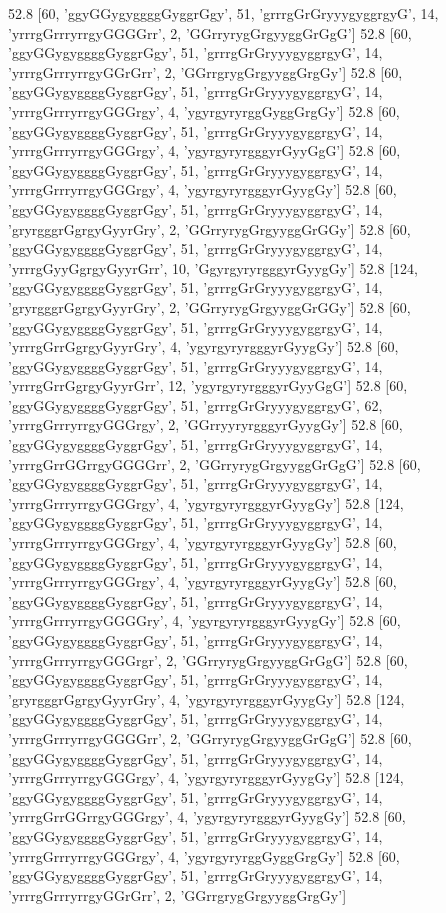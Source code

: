52.8 [60, 'ggyGGygyggggGyggrGgy', 51, 'grrrgGrGryyygyggrgyG', 14, 'yrrrgGrrryrrgyGGGGrr', 2, 'GGrryrygGrgyyggGrGgG']
52.8 [60, 'ggyGGygyggggGyggrGgy', 51, 'grrrgGrGryyygyggrgyG', 14, 'yrrrgGrrryrrgyGGrGrr', 2, 'GGrrgrygGrgyyggGrgGy']
52.8 [60, 'ggyGGygyggggGyggrGgy', 51, 'grrrgGrGryyygyggrgyG', 14, 'yrrrgGrrryrrgyGGGrgy', 4, 'ygyrgyryrggGyggGrgGy']
52.8 [60, 'ggyGGygyggggGyggrGgy', 51, 'grrrgGrGryyygyggrgyG', 14, 'yrrrgGrrryrrgyGGGrgy', 4, 'ygyrgyryrgggyrGyyGgG']
52.8 [60, 'ggyGGygyggggGyggrGgy', 51, 'grrrgGrGryyygyggrgyG', 14, 'yrrrgGrrryrrgyGGGrgy', 4, 'ygyrgyryrgggyrGyygGy']
52.8 [60, 'ggyGGygyggggGyggrGgy', 51, 'grrrgGrGryyygyggrgyG', 14, 'gryrgggrGgrgyGyyrGry', 2, 'GGrryrygGrgyyggGrGGy']
52.8 [60, 'ggyGGygyggggGyggrGgy', 51, 'grrrgGrGryyygyggrgyG', 14, 'yrrrgGyyGgrgyGyyrGrr', 10, 'GgyrgyryrgggyrGyygGy']
52.8 [124, 'ggyGGygyggggGyggrGgy', 51, 'grrrgGrGryyygyggrgyG', 14, 'gryrgggrGgrgyGyyrGry', 2, 'GGrryrygGrgyyggGrGGy']
52.8 [60, 'ggyGGygyggggGyggrGgy', 51, 'grrrgGrGryyygyggrgyG', 14, 'yrrrgGrrGgrgyGyyrGry', 4, 'ygyrgyryrgggyrGyygGy']
52.8 [60, 'ggyGGygyggggGyggrGgy', 51, 'grrrgGrGryyygyggrgyG', 14, 'yrrrgGrrGgrgyGyyrGrr', 12, 'ygyrgyryrgggyrGyyGgG']
52.8 [60, 'ggyGGygyggggGyggrGgy', 51, 'grrrgGrGryyygyggrgyG', 62, 'yrrrgGrrryrrgyGGGrgy', 2, 'GGrryyryrgggyrGyygGy']
52.8 [60, 'ggyGGygyggggGyggrGgy', 51, 'grrrgGrGryyygyggrgyG', 14, 'yrrrgGrrGGrrgyGGGGrr', 2, 'GGrryrygGrgyyggGrGgG']
52.8 [60, 'ggyGGygyggggGyggrGgy', 51, 'grrrgGrGryyygyggrgyG', 14, 'yrrrgGrrryrrgyGGGrgy', 4, 'ygyrgyryrgggyrGyygGy']
52.8 [124, 'ggyGGygyggggGyggrGgy', 51, 'grrrgGrGryyygyggrgyG', 14, 'yrrrgGrrryrrgyGGGrgy', 4, 'ygyrgyryrgggyrGyygGy']
52.8 [60, 'ggyGGygyggggGyggrGgy', 51, 'grrrgGrGryyygyggrgyG', 14, 'yrrrgGrrryrrgyGGGrgy', 4, 'ygyrgyryrgggyrGyygGy']
52.8 [60, 'ggyGGygyggggGyggrGgy', 51, 'grrrgGrGryyygyggrgyG', 14, 'yrrrgGrrryrrgyGGGGry', 4, 'ygyrgyryrgggyrGyygGy']
52.8 [60, 'ggyGGygyggggGyggrGgy', 51, 'grrrgGrGryyygyggrgyG', 14, 'yrrrgGrrryrrgyGGGrgr', 2, 'GGrryrygGrgyyggGrGgG']
52.8 [60, 'ggyGGygyggggGyggrGgy', 51, 'grrrgGrGryyygyggrgyG', 14, 'gryrgggrGgrgyGyyrGry', 4, 'ygyrgyryrgggyrGyygGy']
52.8 [124, 'ggyGGygyggggGyggrGgy', 51, 'grrrgGrGryyygyggrgyG', 14, 'yrrrgGrrryrrgyGGGGrr', 2, 'GGrryrygGrgyyggGrGgG']
52.8 [60, 'ggyGGygyggggGyggrGgy', 51, 'grrrgGrGryyygyggrgyG', 14, 'yrrrgGrrryrrgyGGGrgy', 4, 'ygyrgyryrgggyrGyygGy']
52.8 [124, 'ggyGGygyggggGyggrGgy', 51, 'grrrgGrGryyygyggrgyG', 14, 'yrrrgGrrGGrrgyGGGrgy', 4, 'ygyrgyryrgggyrGyygGy']
52.8 [60, 'ggyGGygyggggGyggrGgy', 51, 'grrrgGrGryyygyggrgyG', 14, 'yrrrgGrrryrrgyGGGrgy', 4, 'ygyrgyryrggGyggGrgGy']
52.8 [60, 'ggyGGygyggggGyggrGgy', 51, 'grrrgGrGryyygyggrgyG', 14, 'yrrrgGrrryrrgyGGrGrr', 2, 'GGrrgrygGrgyyggGrgGy']
